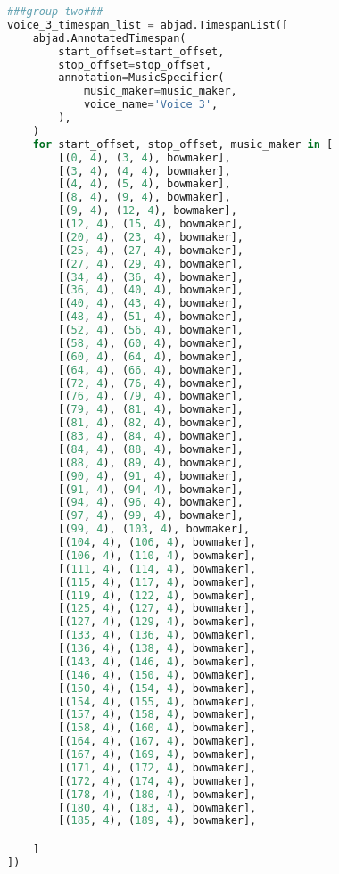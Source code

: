 \begin{lstlisting}[language=Python, caption=Cthar Segment\_I]
###group two###
voice_3_timespan_list = abjad.TimespanList([
    abjad.AnnotatedTimespan(
        start_offset=start_offset,
        stop_offset=stop_offset,
        annotation=MusicSpecifier(
            music_maker=music_maker,
            voice_name='Voice 3',
        ),
    )
    for start_offset, stop_offset, music_maker in [
        [(0, 4), (3, 4), bowmaker],
        [(3, 4), (4, 4), bowmaker],
        [(4, 4), (5, 4), bowmaker],
        [(8, 4), (9, 4), bowmaker],
        [(9, 4), (12, 4), bowmaker],
        [(12, 4), (15, 4), bowmaker],
        [(20, 4), (23, 4), bowmaker],
        [(25, 4), (27, 4), bowmaker],
        [(27, 4), (29, 4), bowmaker],
        [(34, 4), (36, 4), bowmaker],
        [(36, 4), (40, 4), bowmaker],
        [(40, 4), (43, 4), bowmaker],
        [(48, 4), (51, 4), bowmaker],
        [(52, 4), (56, 4), bowmaker],
        [(58, 4), (60, 4), bowmaker],
        [(60, 4), (64, 4), bowmaker],
        [(64, 4), (66, 4), bowmaker],
        [(72, 4), (76, 4), bowmaker],
        [(76, 4), (79, 4), bowmaker],
        [(79, 4), (81, 4), bowmaker],
        [(81, 4), (82, 4), bowmaker],
        [(83, 4), (84, 4), bowmaker],
        [(84, 4), (88, 4), bowmaker],
        [(88, 4), (89, 4), bowmaker],
        [(90, 4), (91, 4), bowmaker],
        [(91, 4), (94, 4), bowmaker],
        [(94, 4), (96, 4), bowmaker],
        [(97, 4), (99, 4), bowmaker],
        [(99, 4), (103, 4), bowmaker],
        [(104, 4), (106, 4), bowmaker],
        [(106, 4), (110, 4), bowmaker],
        [(111, 4), (114, 4), bowmaker],
        [(115, 4), (117, 4), bowmaker],
        [(119, 4), (122, 4), bowmaker],
        [(125, 4), (127, 4), bowmaker],
        [(127, 4), (129, 4), bowmaker],
        [(133, 4), (136, 4), bowmaker],
        [(136, 4), (138, 4), bowmaker],
        [(143, 4), (146, 4), bowmaker],
        [(146, 4), (150, 4), bowmaker],
        [(150, 4), (154, 4), bowmaker],
        [(154, 4), (155, 4), bowmaker],
        [(157, 4), (158, 4), bowmaker],
        [(158, 4), (160, 4), bowmaker],
        [(164, 4), (167, 4), bowmaker],
        [(167, 4), (169, 4), bowmaker],
        [(171, 4), (172, 4), bowmaker],
        [(172, 4), (174, 4), bowmaker],
        [(178, 4), (180, 4), bowmaker],
        [(180, 4), (183, 4), bowmaker],
        [(185, 4), (189, 4), bowmaker],

    ]
])


\end{lstlisting}
